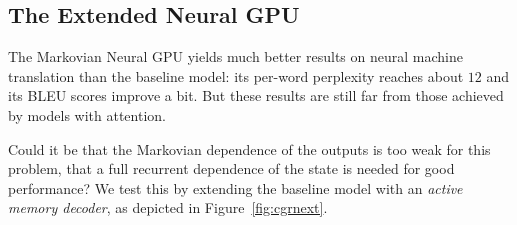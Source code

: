 \documentclass{article}
\begin{document}
\subsection{The Extended Neural GPU}


The Markovian Neural GPU yields much better results on neural
machine translation than the baseline model: its per-word
perplexity reaches about $12$ and its BLEU scores improve a bit.
But these results are still far from those achieved by models
with attention.

Could it be that the Markovian dependence of the outputs is too
weak for this problem, that a full recurrent dependence of the state
is needed for good performance? We test this by extending the baseline
model with an \emph{active memory decoder}, as depicted in
Figure~\ref{fig:cgrnext}.
\end{document}
